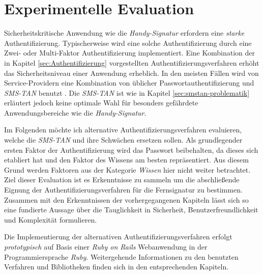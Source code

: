 \documentclass[11pt,a4paper,ngerman]{scrreprt}
\begin{document}
\chapter{Experimentelle Evaluation}
Sicherheitskritische Anwendung wie die \textit{Handy-Signatur} erfordern eine \emph{starke} Authentifizierung. Typischerweise wird eine solche Authentifizierung durch eine Zwei- oder Multi-Faktor Authentifizierung implementiert. Eine Kombination der in Kapitel \ref{sec:Authentifizierung} vorgestellten Authentifizierungsverfahren erhöht das Sicherheitsniveau einer Anwendung erheblich. In den meisten Fällen wird von Service-Providern eine Kombination von üblicher Passwortauthentifizierung und \textit{SMS-TAN} benutzt \cite{fido17}. Die \textit{SMS-TAN} ist wie in Kapitel \ref{sec:smstan-problematik} erläutert jedoch keine optimale Wahl für besonders gefährdete Anwendungsbereiche wie die \textit{Handy-Signatur}.

Im Folgenden möchte ich alternative Authentifizierungsverfahren evaluieren, welche die \textit{SMS-TAN} und ihre Schwächen ersetzen sollen. Als grundlegender ersten Faktor der Authentifizierung wird das Passwort beibehalten, da dieses sich etabliert hat und den Faktor des Wissens am besten repräsentiert. Aus diesem Grund werden Faktoren aus der Kategorie \emph{Wissen} hier nicht weiter betrachtet. Ziel dieser Evaluation ist es Erkenntnisse zu sammeln um die abschließende Eignung der Authentifizierungsverfahren für die Fernsignatur zu bestimmen. Zusammen mit den Erkenntnissen der vorhergegangenen Kapiteln lässt sich so eine fundierte Aussage über die Tauglichkeit in Sicherheit, Benutzerfreundlichkeit und Komplexität formulieren.

Die Implementierung der alternativen Authentifizierungsverfahren erfolgt \emph{prototypisch} auf Basis einer \textit{Ruby on Rails} Webanwendung in der Programmiersprache \textit{Ruby}. Weitergehende Informationen zu den benutzten Verfahren und Bibliotheken finden sich in den entsprechenden Kapiteln.
\end{document}
